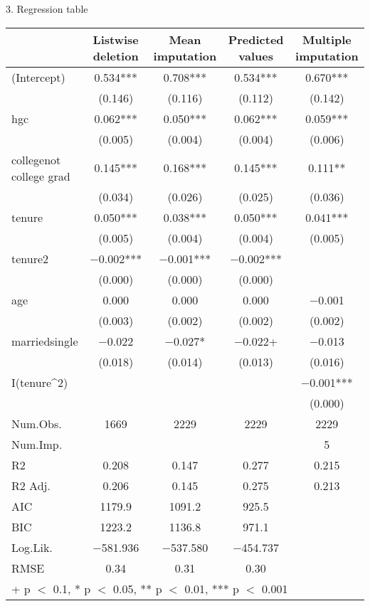 \documentclass{article}
\begin{document}
\vskip10pt
\begin{center}
3. Regression table \\
\begin{tabular}[t]{lcccc}
  & Listwise deletion & Mean imputation & Predicted values & Multiple imputation\\
\midrule
(Intercept) & \num{0.534}*** & \num{0.708}*** & \num{0.534}*** & \num{0.670}***\\
 & (\num{0.146}) & (\num{0.116}) & (\num{0.112}) & (\num{0.142})\\
hgc & \num{0.062}*** & \num{0.050}*** & \num{0.062}*** & \num{0.059}***\\
 & (\num{0.005}) & (\num{0.004}) & (\num{0.004}) & (\num{0.006})\\
collegenot college grad & \num{0.145}*** & \num{0.168}*** & \num{0.145}*** & \num{0.111}**\\
 & (\num{0.034}) & (\num{0.026}) & (\num{0.025}) & (\num{0.036})\\
tenure & \num{0.050}*** & \num{0.038}*** & \num{0.050}*** & \num{0.041}***\\
 & (\num{0.005}) & (\num{0.004}) & (\num{0.004}) & (\num{0.005})\\
tenure2 & \num{-0.002}*** & \num{-0.001}*** & \num{-0.002}*** & \\
 & (\num{0.000}) & (\num{0.000}) & (\num{0.000}) & \\
age & \num{0.000} & \num{0.000} & \num{0.000} & \num{-0.001}\\
 & (\num{0.003}) & (\num{0.002}) & (\num{0.002}) & (\num{0.002})\\
marriedsingle & \num{-0.022} & \num{-0.027}* & \num{-0.022}+ & \num{-0.013}\\
 & (\num{0.018}) & (\num{0.014}) & (\num{0.013}) & (\num{0.016})\\
I(tenure\textasciicircum{}2) &  &  &  & \num{-0.001}***\\
 &  &  &  & (\num{0.000})\\
\midrule
Num.Obs. & \num{1669} & \num{2229} & \num{2229} & \num{2229}\\
Num.Imp. &  &  &  & \num{5}\\
R2 & \num{0.208} & \num{0.147} & \num{0.277} & \num{0.215}\\
R2 Adj. & \num{0.206} & \num{0.145} & \num{0.275} & \num{0.213}\\
AIC & \num{1179.9} & \num{1091.2} & \num{925.5} & \\
BIC & \num{1223.2} & \num{1136.8} & \num{971.1} & \\
Log.Lik. & \num{-581.936} & \num{-537.580} & \num{-454.737} & \\
RMSE & \num{0.34} & \num{0.31} & \num{0.30} & \\
\bottomrule
\multicolumn{5}{l}{\rule{0pt}{1em}+ p $<$ 0.1, * p $<$ 0.05, ** p $<$ 0.01, *** p $<$ 0.001}\\
\end{tabular}
\end{center}
\end{document}
